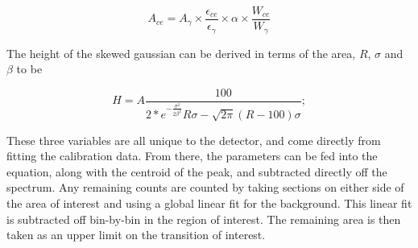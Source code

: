 \begin{equation}
    A_{ce} = A_{\gamma}\times\frac{\epsilon_{ce}}{\epsilon_{\gamma}}\times\alpha\times\frac{W_{ce}}{W_{\gamma}}
    \label{eq:subt_area_skew}
\end{equation}

The height of the skewed gaussian can be derived in terms of the area, $R$, $\sigma$ and $\beta$ to be

\begin{equation}
    H = A\frac{100}{2*e^{-\frac{\sigma^2}{2\beta^2}}R\sigma-\sqrt{2\pi}(R-100)\sigma};
    \label{eq:subt_height_skew}
\end{equation}

These three variables are all unique to the detector, and come directly from fitting the calibration data. From there, the parameters can be fed into the equation, along with the centroid of the peak, and subtracted directly off the spectrum. Any remaining counts are counted by taking sections on either side of the area of interest and using a global linear fit for the background. This linear fit is subtracted off bin-by-bin in the region of interest. The remaining area is then taken as an upper limit on the transition of interest.
